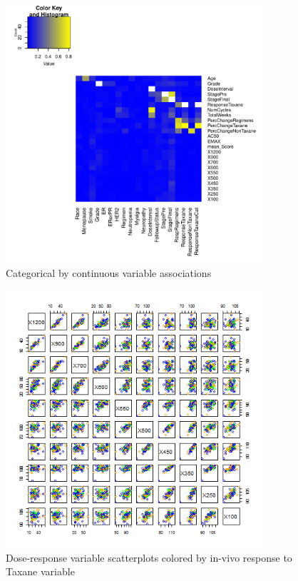 \documentclass[12pt]{article}
\begin{document}
\begin{figure}[h]
\caption{Categorical by continuous variable associations}
\centering
\includegraphics[width=0.85\textwidth]{etaSQ}
\end{figure}
\begin{figure}[h]
\caption{Dose-response variable scatterplots colored by in-vivo response to Taxane variable}
\centering
\includegraphics[width=0.85\textwidth]{pairPlot}
\end{figure}
\end{document}
